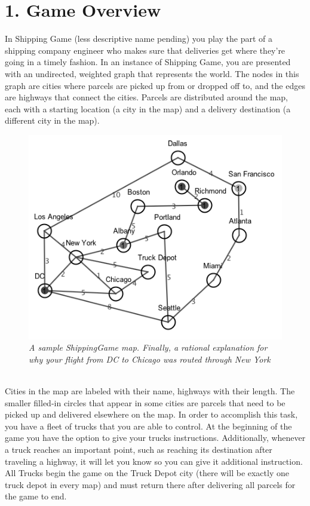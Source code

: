 \documentclass[11pt]{article}
\begin{document}
\section{1. Game Overview}
In Shipping Game (less descriptive name pending) you play the part of a shipping company engineer who makes sure that deliveries get where they're going in a timely fashion. In an instance of Shipping Game, you are presented with an undirected, weighted graph that represents the world. The nodes in this graph are cities where parcels are picked up from or dropped off to, and the edges are highways that connect the cities. Parcels are distributed around the map, each with a starting location (a city in the map) and a delivery destination (a different city in the map).\\
\begin{figure}[h]
\centerline{\includegraphics[scale=0.75]{map1.png}} 
\caption{\em{A sample ShippingGame map. Finally, a rational explanation for why your flight from DC to Chicago was routed through New York}}
\end{figure}\\
Cities in the map are labeled with their name, highways with their length. The smaller filled-in circles that appear in some cities are parcels that need to be picked up and delivered elsewhere on the map.
In order to accomplish this task, you have a fleet of trucks that you are able to control. At the beginning of the game you have the option to give your trucks instructions. Additionally, whenever a truck reaches an important point, such as reaching its destination after traveling a highway, it will let you know so you can give it additional instruction. All Trucks begin the game on the Truck Depot city (there will be exactly one truck depot in every map) and must return there after delivering all parcels for the game to end.
\end{document}
